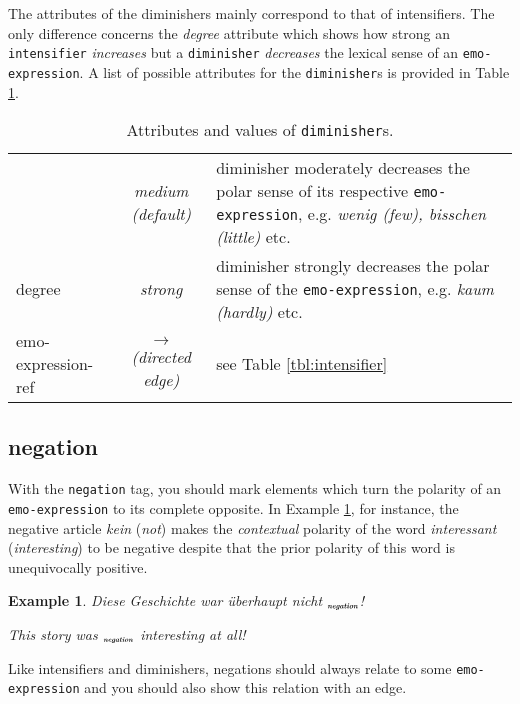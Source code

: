 \documentclass[11pt,a4paper]{article}
\newlength{\clmnwidth}
\theoremstyle{mytheoremstyle}
\newtheorem{exmp}{Example}[section]
\newcommand{\mtag}[2]{{\upshape[\emph{#2}\upshape]$_{\textrm{\bfseries\emph{\tiny
        #1}}}$}}
\newcommand{\negation}[2][]{\mtag{ne\-ga\-tion\ifstrempty{#1}{}{:#1}}{#2}}
\begin{document}
The attributes of the diminishers mainly correspond to that of
intensifiers.  The only difference concerns the \textit{degree}
attribute which shows how strong an \texttt{intensifier}
\emph{increases} but a \texttt{diminisher} \emph{decreases} the
lexical sense of an \texttt{emo-expression}.  A list of possible
attributes for the \texttt{diminisher}s is provided in Table
\ref{tbl:diminisher}.
\begin{center}
  \begin{table}[hb]
    \caption{Attributes and values of \texttt{diminisher}s.}
    \begin{tabular}{|l|c|p{0.88\clmnwidth}|}\hline

      & \textit{medium (default)} & diminisher moderately decreases
      the polar sense of its respective \texttt{emo-expression},
      e.g. \textit{wenig (few), bisschen (little)} etc.\\\cline{2-3}

      \multirow{-2}{*}{degree} & \textit{strong} & diminisher strongly
      decreases the polar sense of the \texttt{emo-expression},
      e.g. \textit{kaum (hardly)} etc.\\\hline

      emo-expression-ref & \textit{$\longrightarrow$\newline(directed
        edge)} & see Table \ref{tbl:intensifier}\\\hline
    \end{tabular}
    \label{tbl:diminisher}
  \end{table}
\end{center}

\subsection{negation}
With the \texttt{negation} tag, you should mark elements which turn
the polarity of an \texttt{emo-expression} to its complete opposite.
In Example \ref{exmp:negation}, for instance, the negative article
\textit{kein} (\textit{not}) makes the \emph{contextual} polarity of
the word \textit{interessant} (\textit{interesting}) to be negative
despite that the prior polarity of this word is unequivocally
positive.
\begin{exmp}
Diese Geschichte war \"uberhaupt nicht \negation{interessant}!

This story was \negation{not} interesting at all!\label{exmp:negation}
\end{exmp}
Like intensifiers and diminishers, negations should always relate to
some \texttt{emo-expression} and you should also show this relation
with an edge.
\end{document}
